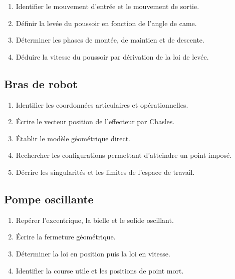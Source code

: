 
\begin{enumerate}
  \item Identifier le mouvement d'entrée et le mouvement de sortie.
  \item Définir la levée du poussoir en fonction de l'angle de came.
  \item Déterminer les phases de montée, de maintien et de descente.
  \item Déduire la vitesse du poussoir par dérivation de la loi de levée.
\end{enumerate}

\subsection{Bras de robot}

\begin{center}
\hfill
{}
\end{center}

\begin{enumerate}
  \item Identifier les coordonnées articulaires et opérationnelles.
  \item Écrire le vecteur position de l'effecteur par Chasles.
  \item Établir le modèle géométrique direct.
  \item Rechercher les configurations permettant d'atteindre un point imposé.
  \item Décrire les singularités et les limites de l'espace de travail.
\end{enumerate}

\subsection{Pompe oscillante}

\begin{center}
\hfill
{}\hfill
{}
\end{center}

\begin{enumerate}
  \item Repérer l'excentrique, la bielle et le solide oscillant.
  \item Écrire la fermeture géométrique.
  \item Déterminer la loi en position puis la loi en vitesse.
  \item Identifier la course utile et les positions de point mort.
\end{enumerate}

